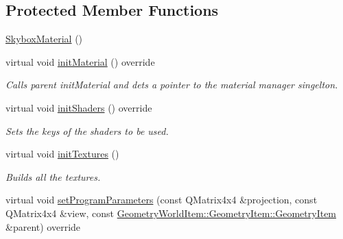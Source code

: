 \subsection*{Protected Member Functions}
\begin{DoxyCompactItemize}
\item 
\mbox{\hyperlink{class_geometry_engine_1_1_geometry_material_1_1_skybox_material_ab2e9b5f4126857d70499480be0de286d}{Skybox\+Material}} ()
\item 
\mbox{\label{class_geometry_engine_1_1_geometry_material_1_1_skybox_material_addb02e1a849df4b8bb157a30d3544afa}} 
virtual void \mbox{\hyperlink{class_geometry_engine_1_1_geometry_material_1_1_skybox_material_addb02e1a849df4b8bb157a30d3544afa}{init\+Material}} () override
\begin{DoxyCompactList}\small\item\em Calls parent init\+Material and dets a pointer to the material manager singelton. \end{DoxyCompactList}\item 
\mbox{\label{class_geometry_engine_1_1_geometry_material_1_1_skybox_material_a932f34e678f90b14b8bab22954e7abdb}} 
virtual void \mbox{\hyperlink{class_geometry_engine_1_1_geometry_material_1_1_skybox_material_a932f34e678f90b14b8bab22954e7abdb}{init\+Shaders}} () override
\begin{DoxyCompactList}\small\item\em Sets the keys of the shaders to be used. \end{DoxyCompactList}\item 
\mbox{\label{class_geometry_engine_1_1_geometry_material_1_1_skybox_material_a86bbb73a1196ef11a9546abdbe13b09d}} 
virtual void \mbox{\hyperlink{class_geometry_engine_1_1_geometry_material_1_1_skybox_material_a86bbb73a1196ef11a9546abdbe13b09d}{init\+Textures}} ()
\begin{DoxyCompactList}\small\item\em Builds all the textures. \end{DoxyCompactList}\item 
virtual void \mbox{\hyperlink{class_geometry_engine_1_1_geometry_material_1_1_skybox_material_a7760402d819462db205dadf3f370af73}{set\+Program\+Parameters}} (const Q\+Matrix4x4 \&projection, const Q\+Matrix4x4 \&view, const \mbox{\hyperlink{class_geometry_engine_1_1_geometry_world_item_1_1_geometry_item_1_1_geometry_item}{Geometry\+World\+Item\+::\+Geometry\+Item\+::\+Geometry\+Item}} \&parent) override

\end{DoxyCompactItemize}

